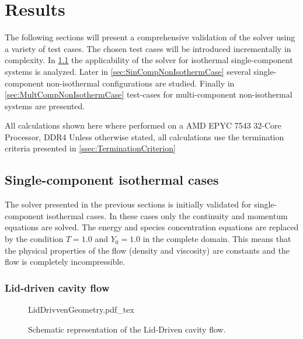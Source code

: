 \chapter{Results}	\label{ch:results}
\glsresetall
 The following sections will present a comprehensive validation of the solver using a variety of test cases. The chosen test cases will be introduced incrementally in complexity. In \cref{sec:SingleCompIsotCase} the applicability of the solver for isothermal single-component systems is analyzed. Later in \cref{sec:SinCompNonIsothermCase} several single-component non-isothermal configurations are studied. Finally in \cref{sec:MultCompNonIsothermCase} test-cases for multi-component non-isothermal systems are presented. 



All calculations shown here where performed on a  AMD EPYC 7543 32-Core Processor, DDR4 %
Unless otherwise stated, all calculations use the termination criteria presented in \cref{ssec:TerminationCriterion}

\section{Single-component isothermal cases}\label{sec:SingleCompIsotCase}
The solver presented in the previous sections is initially validated for single-component isothermal cases. In these cases only the continuity and momentum equations are solved. The energy and species concentration equations  are replaced by the condition $T = 1.0$ and $Y_0 = 1.0$ in the complete domain. This means that the physical properties of the flow (density and viscosity) are constants and the flow is completely incompressible.

\subsection{Lid-driven cavity flow}
\begin{figure}[b]
	\begin{center}
		\def\svgwidth{0.3\textwidth}
		{LidDrivvenGeometry.pdf_tex}		
		\caption{Schematic representation of the Lid-Driven cavity flow.}
		\label{fig:LidDrivenCavity}
	\end{center}	
\end{figure} 

